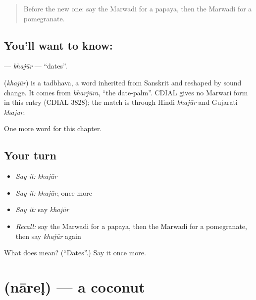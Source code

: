 \label{lesson:MW-C137-khajur}



\begin{quote}
Before the new one: say the Marwadi for a papaya, then the Marwadi for a pomegranate.
\end{quote}

\subsection*{You'll want to know: }
\textbf{} — \emph{khajūr} — \textquotedblleft{}dates\textquotedblright{}.

\begin{cousinweb}
\textbf{} (\emph{khajūr}) is a tadbhava, a word inherited from Sanskrit and reshaped by sound change. It comes from \emph{kharjūra}, \textquotedblleft{}the date-palm\textquotedblright{}. CDIAL gives no Marwari form in this entry (CDIAL 3828); the match is through Hindi \emph{khajūr} and Gujarati \emph{khajur}.
\end{cousinweb}

\begin{grammarlens}[title={What you've built}]
One more word for this chapter.
\end{grammarlens}

\subsection*{Your turn}
\begin{itemize}
\raggedright
  \item \emph{Say it:} \emph{khajūr}
  \item \emph{Say it:} \emph{khajūr}, once more
  \item \emph{Say it:} say \emph{khajūr}
  \item \emph{Recall:} say the Marwadi for a papaya, then the Marwadi for a pomegranate, then say \emph{khajūr} again
\end{itemize}

\begin{tcolorbox}[breakable,colback=teal!4,colframe=teal!35!black,title={Before you move on}]
What does  mean? (\textquotedblleft{}Dates\textquotedblright{}.) Say it once more.
\end{tcolorbox}
\section[\texorpdfstring{\mw{नारेळ} (nāreḷ)}{नारेळ (nāreḷ)}]{ (nāreḷ) — a coconut}

